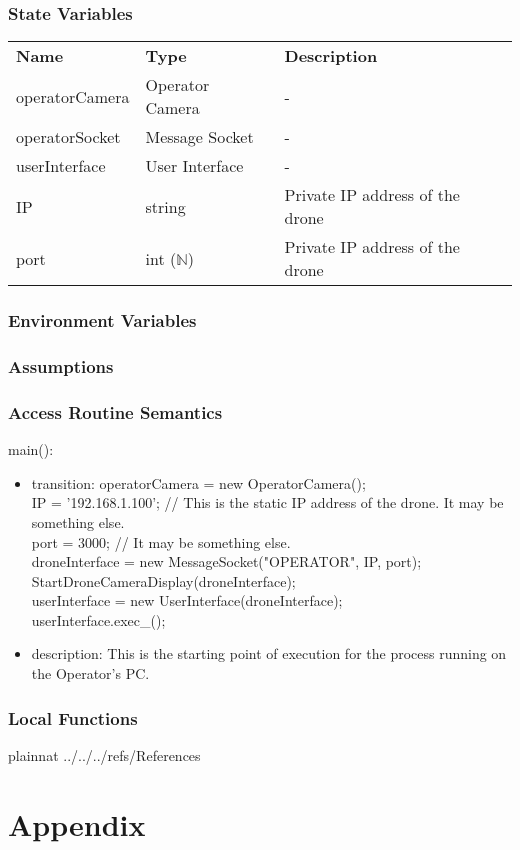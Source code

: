 \documentclass[12pt, titlepage]{article}
\begin{document}
\subsubsection{State Variables}
\begin{center}
\begin{tabular}{p{3 cm} p{4cm} p{5cm} }
\hline
\textbf{Name} & \textbf{Type} & \textbf{Description}  \\
operatorCamera & Operator Camera & - \\
operatorSocket & Message Socket & - \\
userInterface & User Interface & - \\
IP & string & Private IP address of the drone \\
port & int ($\mathbb{N}$) & Private IP address of the drone \\
\hline
\hline
\end{tabular}
\end{center}
\subsubsection{Environment Variables}
\subsubsection{Assumptions}
\subsubsection{Access Routine Semantics}
\noindent main():
\begin{itemize}
\item transition: operatorCamera = new OperatorCamera(); \\
IP = '192.168.1.100'; // This is the static IP address of the drone. It may be something else. \\
port = 3000; // It may be something else. \\
droneInterface = new MessageSocket("OPERATOR", IP, port); \\
StartDroneCameraDisplay(droneInterface); \\
userInterface = new UserInterface(droneInterface);\\
userInterface.exec\_();
\item description: This is the starting point of execution for the process running on the Operator's PC.
\end{itemize}
\subsubsection{Local Functions}
\newpage






 {plainnat}
 {../../../refs/References}

\newpage

\section{Appendix} \label{Appendix}

\end{document}
